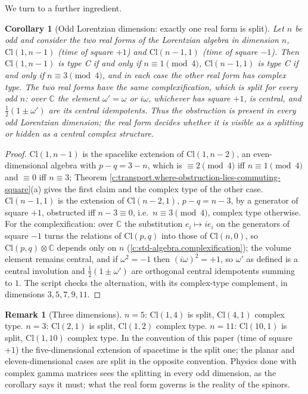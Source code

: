 \documentclass[11pt]{article}
\newtheorem{corollary}[theorem]{Corollary}
\theoremstyle{definition}
\newtheorem{remark}[theorem]{Remark}
\theoremstyle{plain}
\providecommand{\C}{}\renewcommand{\C}{\mathbb{C}}
\providecommand{\Cl}{}\renewcommand{\Cl}{\mathrm{Cl}}
\begin{document}
We turn to a further ingredient.

\begin{corollary}[Odd Lorentzian dimension: exactly one real form is split]\label{c:transport.odd-lorentzian-dimension-exactly-one-real}
Let $n$ be odd and consider the two real forms of the Lorentzian algebra in dimension $n$, $\Cl(1,n{-}1)$ (time of square $+1$) and $\Cl(n{-}1,1)$ (time of square $-1$). Then $\Cl(1,n{-}1)$ is type C if and only if $n \equiv 1 \pmod 4$, $\Cl(n{-}1,1)$ is type C if and only if $n \equiv 3 \pmod 4$, and in each case the other real form has complex type. The two real forms have the same complexification, which is split for every odd $n$: over $\C$ the element $\omega' = \omega$ or $i\omega$, whichever has square $+1$, is central, and $\tfrac12(1 \pm \omega')$ are its central idempotents. Thus the obstruction is present in every odd Lorentzian dimension; the real form decides whether it is visible as a splitting or hidden as a central complex structure.
\end{corollary}
\begin{proof}
$\Cl(1,n{-}1)$ is the spacelike extension of $\Cl(1,n{-}2)$, an even-dimensional algebra with $p - q = 3 - n$, which is $\equiv 2 \pmod 4$ iff $n \equiv 1 \pmod 4$ and $\equiv 0$ iff $n \equiv 3$; Theorem \ref{c:transport.where-obstruction-lies-commuting-square}(a) gives the first claim and the complex type of the other case. $\Cl(n{-}1,1)$ is the extension of $\Cl(n{-}2,1)$, $p - q = n - 3$, by a generator of square $+1$, obstructed iff $n - 3 \equiv 0$, i.e.\ $n \equiv 3 \pmod 4$, complex type otherwise. For the complexification: over $\C$ the substitution $e_i \mapsto ie_i$ on the generators of square $-1$ turns the relations of $\Cl(p,q)$ into those of $\Cl(n,0)$, so $\Cl(p,q) \otimes \C$ depends only on $n$ (\ref{c:std-algebra.complexification}); the volume element remains central, and if $\omega^2 = -1$ then $(i\omega)^2 = +1$, so $\omega'$ as defined is a central involution and $\tfrac12(1 \pm \omega')$ are orthogonal central idempotents summing to $1$. The script checks the alternation, with its complex-type complement, in dimensions $3, 5, 7, 9, 11$.

\end{proof}

\begin{remark}[Three dimensions]\label{c:note.transport.three-dimensions}
$n = 5$: $\Cl(1,4)$ is split, $\Cl(4,1)$ complex type. $n = 3$: $\Cl(2,1)$ is split, $\Cl(1,2)$ complex type. $n = 11$: $\Cl(10,1)$ is split, $\Cl(1,10)$ complex type. In the convention of this paper (time of square $+1$) the five-dimensional extension of spacetime is the split one; the planar and eleven-dimensional cases are split in the opposite convention. Physics done with complex gamma matrices sees the splitting in every odd dimension, as the corollary says it must; what the real form governs is the reality of the spinors.
\end{remark}
\end{document}
